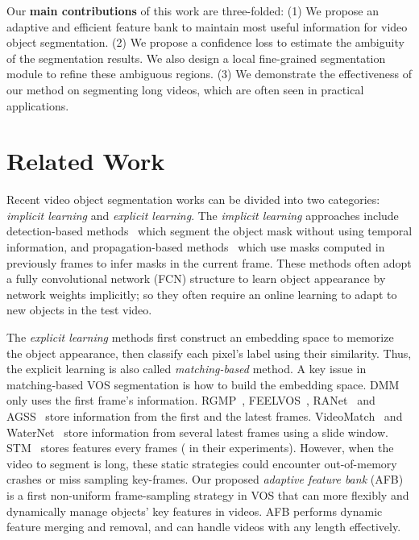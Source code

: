 \documentclass{article}
\begin{document}
Our \textbf{main contributions} of this work are three-folded:  
(1) We propose an adaptive and efficient feature bank to maintain most useful information for video object segmentation.
(2) We propose a confidence loss to estimate the ambiguity of the segmentation results. We also design a local fine-grained segmentation module to refine these ambiguous regions.
(3) We demonstrate the effectiveness of our method on segmenting long videos, which are often seen in practical applications.


\section{Related Work}

Recent video object segmentation works can be divided into two categories: \emph{implicit learning} and \emph{explicit learning}. 
The \emph{implicit learning} approaches include detection-based methods~\cite{caelles2017one, maninis_video_2019} which segment the object mask without using temporal information, and propagation-based methods~\cite{Perazzi2017, hu_maskrnn_2017, voigtlaender17BMVC, bao_cnn_2018, LucidDataDreaming_CVPR17_workshops, hu_motion-guided_2018} which use masks computed in previously frames to infer masks in the current frame. 
These methods often adopt a fully convolutional network (FCN) structure to learn object appearance by network weights implicitly; so they often require an online learning to adapt to new objects in the test video.

The \emph{explicit learning} methods first construct an embedding space to memorize the object appearance, then classify each pixel's label using their similarity. 
Thus, the explicit learning is also called \emph{matching-based} method.
A key issue in matching-based VOS segmentation is how to build the embedding space. 
DMM~\cite{zeng_dmm-net_2019} only uses the first frame's information.
RGMP~\cite{oh_fast_2018}, FEELVOS~\cite{voigtlaender2019feelvos}, RANet~\cite{wang_ranet_2019} and AGSS~\cite{lin_agss-vos_2019} store information from the first and the latest frames. 
VideoMatch~\cite{hu2018videomatch} and WaterNet~\cite{liang2020waternet} store information from several latest frames using a slide window.
STM~\cite{oh_video_2019} stores features every  frames ( in their experiments). 
However, when the video to segment is long,  these static strategies could encounter out-of-memory crashes or miss sampling key-frames. 
Our proposed \emph{adaptive feature bank} (AFB) is a first non-uniform frame-sampling strategy in VOS that can more flexibly and dynamically manage objects' key features in videos. 
AFB performs dynamic feature merging and removal, and can handle videos with any length effectively.
\end{document}
